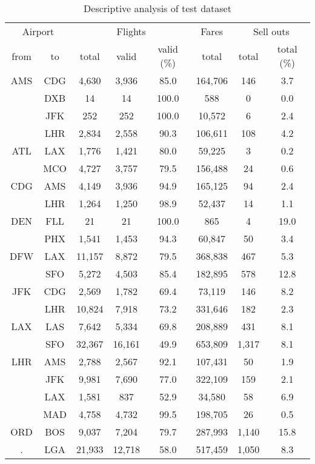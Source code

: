 \begin{table}[h]
\centering
\begin{tabular}{c c | c c c | c | c c}
\toprule
\multicolumn{2}{c|}{Airport}  & \multicolumn{3}{c|}{Flights} & Fares & \multicolumn{2}{c}{Sell outs} \\[.4ex]
from &  to  & total  & valid  & valid (\%)  &  total  &  total  &  total (\%) \\
\midrule
AMS  &  CDG  &   4,630  &   3,936  &   85.0  &  164,706  &    146  &   3.7 \\
~    &  DXB  &      14  &      14  &  100.0  &      588  &      0  &   0.0 \\
~    &  JFK  &     252  &     252  &  100.0  &   10,572  &      6  &   2.4 \\
~    &  LHR  &   2,834  &   2,558  &   90.3  &  106,611  &    108  &   4.2 \\[.5ex]
ATL  &  LAX  &   1,776  &   1,421  &   80.0  &   59,225  &      3  &   0.2 \\
~    &  MCO  &   4,727  &   3,757  &   79.5  &  156,488  &     24  &   0.6 \\[.5ex]
CDG  &  AMS  &   4,149  &   3,936  &   94.9  &  165,125  &     94  &   2.4 \\
~    &  LHR  &   1,264  &   1,250  &   98.9  &   52,437  &     14  &   1.1 \\[.5ex]
DEN  &  FLL  &      21  &      21  &  100.0  &      865  &      4  &  19.0 \\
~    &  PHX  &   1,541  &   1,453  &   94.3  &   60,847  &     50  &   3.4 \\[.5ex]
DFW  &  LAX  &  11,157  &   8,872  &   79.5  &  368,838  &    467  &   5.3 \\
~    &  SFO  &   5,272  &   4,503  &   85.4  &  182,895  &    578  &  12.8 \\[.5ex]
JFK  &  CDG  &   2,569  &   1,782  &   69.4  &   73,119  &    146  &   8.2 \\
~    &  LHR  &  10,824  &   7,918  &   73.2  &  331,646  &    182  &   2.3 \\[.5ex]
LAX  &  LAS  &   7,642  &   5,334  &   69.8  &  208,889  &    431  &   8.1 \\
~    &  SFO  &  32,367  &  16,161  &   49.9  &  653,809  &  1,317  &   8.1 \\[.5ex]
LHR  &  AMS  &   2,788  &   2,567  &   92.1  &  107,431  &     50  &   1.9 \\
~    &  JFK  &   9,981  &   7,690  &   77.0  &  322,109  &    159  &   2.1 \\
~    &  LAX  &   1,581  &     837  &   52.9  &   34,580  &     58  &   6.9 \\
~    &  MAD  &   4,758  &   4,732  &   99.5  &  198,705  &     26  &   0.5 \\[.5ex]
ORD  &  BOS  &   9,037  &   7,204  &   79.7  &  287,993  &  1,140  &  15.8 \\
.    &  LGA  &  21,933  &  12,718  &   58.0  &  517,459  &  1,050  &   8.3 \\
\bottomrule
\end{tabular}
\caption{Descriptive analysis of test dataset}
\label{tbl:DescriptiveAnalysisTestDataset}
\end{table}



